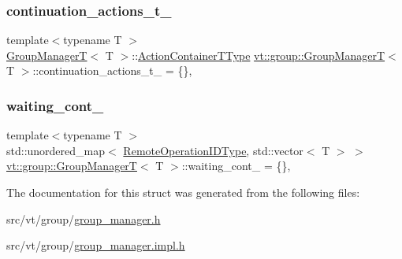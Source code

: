 \subsubsection{\texorpdfstring{continuation\+\_\+actions\+\_\+t\+\_\+}{continuation\_actions\_t\_}}
{\footnotesize\ttfamily template$<$typename T $>$ \\
\hyperlink{structvt_1_1group_1_1_group_manager_t}{Group\+ManagerT}$<$ T $>$\+::\hyperlink{structvt_1_1group_1_1_group_manager_t_adc0d6d680c4f8bdbb80cd90f84a5f7ee}{Action\+Container\+T\+Type} \hyperlink{structvt_1_1group_1_1_group_manager_t}{vt\+::group\+::\+Group\+ManagerT}$<$ T $>$\+::continuation\+\_\+actions\+\_\+t\+\_\+ = \{\}\hspace{0.3cm}{\ttfamily [static]}, {\ttfamily [private]}}

\mbox{\label{structvt_1_1group_1_1_group_manager_t_a294adcb4f4b41892733f29b9dea70f9e}} 
\subsubsection{\texorpdfstring{waiting\+\_\+cont\+\_\+}{waiting\_cont\_}}
{\footnotesize\ttfamily template$<$typename T $>$ \\
std\+::unordered\+\_\+map$<$ \hyperlink{namespacevt_1_1group_a73f2624ddeb535b39a08b6524f26b244}{Remote\+Operation\+I\+D\+Type}, std\+::vector$<$ T $>$ $>$ \hyperlink{structvt_1_1group_1_1_group_manager_t}{vt\+::group\+::\+Group\+ManagerT}$<$ T $>$\+::waiting\+\_\+cont\+\_\+ = \{\}\hspace{0.3cm}{\ttfamily [static]}, {\ttfamily [private]}}



The documentation for this struct was generated from the following files\+:\begin{DoxyCompactItemize}
\item 
src/vt/group/\hyperlink{group__manager_8h}{group\+\_\+manager.\+h}\item 
src/vt/group/\hyperlink{group__manager_8impl_8h}{group\+\_\+manager.\+impl.\+h}\end{DoxyCompactItemize}
